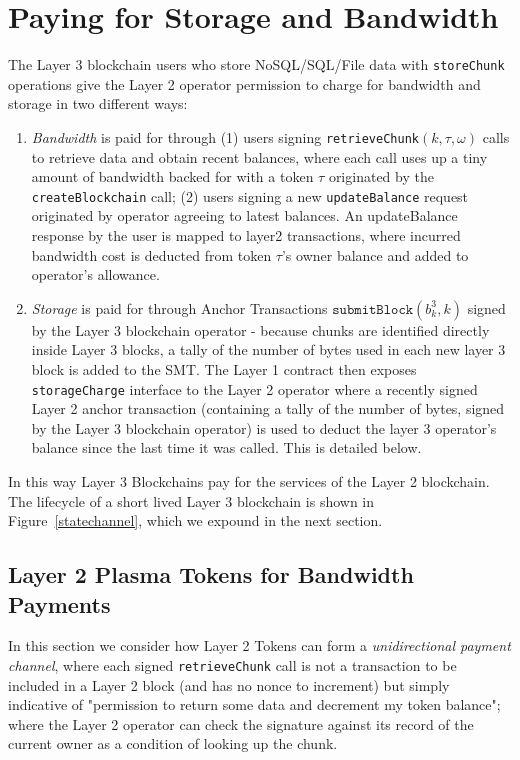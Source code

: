 \documentclass{article}
\newcommand{\blockhash}[2]{b^{#1}_{#2}}
\newcommand{\signature}{\omega}
\newcommand{\submitblock}[2]{\texttt{submitBlock}(#2, #1)}
\begin{document}
\section{Paying for Storage and Bandwidth}
The Layer 3 blockchain users who store NoSQL/SQL/File data with
\texttt{storeChunk} operations give the Layer 2 operator permission to charge for bandwidth and storage in two different ways:

\begin{enumerate}
\item {\em Bandwidth} is paid for through (1) users signing  \texttt{retrieveChunk}$(k, \tau, \signature)$ calls to retrieve data and obtain recent balances, where each call uses up a tiny amount of bandwidth backed for with a token $\tau$ originated by the \texttt{createBlockchain} call; (2) users signing a new \texttt{updateBalance} request originated by operator agreeing to latest balances. An updateBalance response by the user is mapped to layer2 transactions, where incurred bandwidth cost is deducted from token $\tau$'s owner balance and added to operator's allowance.

\item {\em Storage} is paid for through Anchor Transactions $\submitblock{k}{\blockhash{3}{k}}$ signed by the Layer 3 blockchain operator - because chunks are identified directly inside Layer 3 blocks, a tally of the number of bytes used in each new layer 3 block is added to the SMT.  The Layer 1 contract then exposes \texttt{storageCharge} interface to the Layer 2 operator where a recently signed Layer 2 anchor transaction (containing a tally of the number of bytes, signed by the Layer 3 blockchain operator) is used to deduct the layer 3 operator's balance since the last time it was called.   This is detailed below.
\end{enumerate}
In this way Layer 3 Blockchains pay for the services of the Layer 2 blockchain.  The lifecycle of a short lived Layer 3 blockchain is shown in Figure~\ref{statechannel}, which we expound in the next section.

\subsection{Layer 2 Plasma Tokens for Bandwidth Payments}

In this section we  consider how Layer 2 Tokens can form a {\em unidirectional payment channel}, where each signed \texttt{retrieveChunk} call is not a transaction to be included in a Layer 2 block (and has no nonce to increment) but simply indicative of "permission to return some data and decrement my token balance"; where the Layer 2 operator can check the signature against its record of the current owner as a condition of looking up the chunk.  
\end{document}
